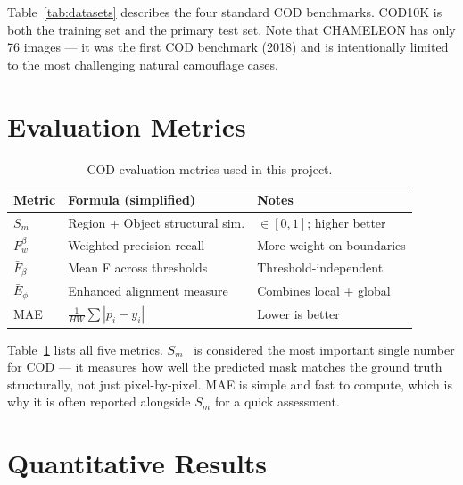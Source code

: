 \documentclass[12pt,a4paper]{report}
\begin{document}
\noindent Table~\ref{tab:datasets} describes the four standard COD benchmarks. COD10K is both the training set and the primary test set. Note that CHAMELEON has only 76 images — it was the first COD benchmark (2018) and is intentionally limited to the most challenging natural camouflage cases.

\section{Evaluation Metrics}

\begin{table}[H]
\centering
\caption{COD evaluation metrics used in this project.}
\label{tab:metrics}
\begin{tabular}{@{}lll@{}}
\toprule
\textbf{Metric} & \textbf{Formula (simplified)} & \textbf{Notes} \\
\midrule
$S_m$            & Region + Object structural sim. & $\in[0,1]$; higher better \cite{fan2017} \\
$F_w^\beta$      & Weighted precision-recall       & More weight on boundaries \\ 
$\bar{F}_\beta$  & Mean F across thresholds        & Threshold-independent \\
$\bar{E}_\phi$   & Enhanced alignment measure      & Combines local + global \cite{fan2018} \\
MAE              & $\frac{1}{HW}\sum|p_i - y_i|$  & Lower is better \\
\bottomrule
\end{tabular}
\end{table}

\noindent Table~\ref{tab:metrics} lists all five metrics. $S_m$~\cite{fan2017} is considered the most important single number for COD — it measures how well the predicted mask matches the ground truth structurally, not just pixel-by-pixel. MAE is simple and fast to compute, which is why it is often reported alongside $S_m$ for a quick assessment.

\section{Quantitative Results}
\end{document}
